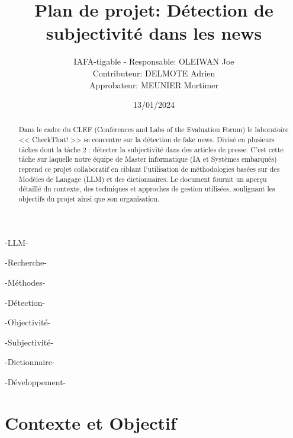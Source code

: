 \documentclass[11pt]{rapport_class}
\title{Plan de projet: Détection de subjectivité dans les news}
\author{IAFA-tigable - Responsable: OLEIWAN Joe \\ Contributeur: DELMOTE Adrien \\ Approbateur: MEUNIER Mortimer}
\date{13/01/2024}
\begin{document}
\maketitle

\begin{abstract}
Dans le cadre du CLEF (Conferences and Labs of the Evaluation Forum) le laboratoire << CheckThat! >> se concentre sur la détection de fake news. Divisé en plusieurs tâches dont la tâche 2 : détecter la subjectivité dans des articles de presse. C'est cette tâche sur laquelle notre équipe de Master informatique (IA et Systèmes embarqués) reprend ce projet collaboratif en ciblant l'utilisation de méthodologies basées sur des Modèles de Langage (LLM) et des dictionnaires. Le document fournit un aperçu détaillé du contexte, des techniques et approches de gestion utilisées, soulignant les objectifs du projet ainsi que son organisation.



\end{abstract}

\smallskip
\begin{motsclefs}
\smallskip
\centerline{-LLM-}
\centerline{-Recherche-}
\centerline{-Méthodes-}
\centerline{-Détection-}
\centerline{-Objectivité-}
\centerline{-Subjectivité-}
\centerline{-Dictionnaire-}
\centerline{-Développement-}
\end{motsclefs}

\tableofcontents

\chapter{Contexte et Objectif}
\end{document}
